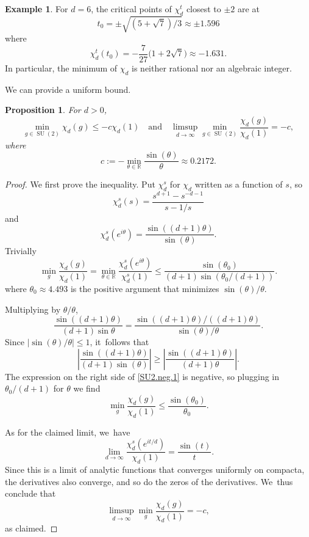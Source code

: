 \documentclass[JEP,XML,SOM,Unicode,NoFloatCountersInSection,published]{cedram}
\newtheorem{prop}[equation]{Proposition}
\theoremstyle{definition}
\newtheorem{example}[equation]{Example}
\let\sinfty c
\newcommand{\R}{\mathbb{R}}
\DeclareMathOperator{\SU}{SU}
\newcommand{\thinfty}{\theta_0}
\begin{document}
\begin{example} \label{SU2.chi}
For $d = 6$, the critical points of $\chi^t_d$ closest to $\pm 2$ are at
\[
t_0 = \pm \sqrt{(5 + \sqrt{7})/3} \approx \pm 1.596
\]
where
\[
\chi^t_d(t_0) = -\frac{7}{27} \bigl(1+2 \sqrt{7}\bigr) \approx -1.631.
\]
In particular, the minimum of $\chi_d$ is neither rational nor an algebraic integer.
\end{example}

We can provide a uniform bound.

\begin{prop} \label{SU2.neg}
For $d > 0$,
\[
\min_{g \in \SU(2)} \chi_d(g) \le -\sinfty \chi_d(1) \quad \text{and} \quad \limsup_{d\to\infty} \min_{g\in\SU(2)} \frac{\chi_d(g)}{\chi_d(1)}
= -\sinfty,
\]
where
\[
\sinfty := -\min_{\theta \in \R} \frac{\sin(\theta)}{\theta} \approx 0.2172.
\]
\end{prop}

\begin{proof}
We first prove the inequality. Put $\chi^s_d$ for $\chi_d$ written as a function of $s$, so
\[
\chi^s_d(s) = \frac{s^{d+1}-s^{-d-1}}{s-1/s}
\]
and
\[
\chi^s_d(e^{i\theta}) = \frac{\sin((d+1)\theta)}{\sin(\theta)}.
\]
Trivially
\begin{equation} \label{SU2.neg.1}
\min_{g} \frac{\chi_d(g)}{\chi_d(1)} = \min_{\theta\in \R} \frac{\chi_d^s(e^{i\theta})}{\chi_d^s(1)} \le \frac{\sin(\thinfty)}{(d+1)\sin(\thinfty/(d+1))}.
\end{equation}
where $\thinfty\approx 4.493$ is the positive argument that minimizes $\sin(\theta)/\theta$.

Multiplying by $\theta/\theta$,
\[
\frac{\sin((d+1)\theta)}{(d+1)\sin\theta} = \frac{\sin((d+1)\theta)/((d+1)\theta)}{\sin(\theta)/\theta}.
\]
Since $\left| \sin (\theta) / \theta \right| \le 1$, it~follows that
\[
\left| \frac{\sin((d+1)\theta)}{(d+1)\sin(\theta)} \right| \ge \left| \frac{\sin((d+1) \theta)}{(d+1)\theta} \right|.
\]
The expression on the right side of \eqref{SU2.neg.1} is negative, so plugging in $\thinfty/(d+1)$ for $\theta$ we find
\[
\min_{g} \frac{\chi_d(g)}{\chi_d(1)} \le \frac{\sin(\thinfty)}{\thinfty}.
\]

As for the claimed limit, we~have
\[
\lim_{d\to\infty}\frac{\chi^s_d(e^{it/d})}{\chi_d(1)} = \frac{\sin(t)}{t}.
\]
Since this is a limit of analytic functions that converges uniformly on
compacta, the derivatives also converge, and so do the zeros of the
derivatives. We~thus conclude that
\[
\limsup_{d\to\infty} \min_g \frac{\chi_d(g)}{\chi_d(1)} = -\sinfty,
\]
as claimed.
\end{proof}
\end{document}
